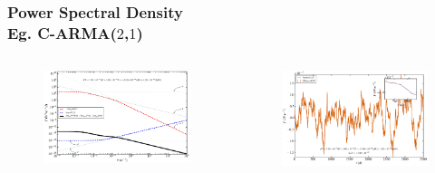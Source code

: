 \documentclass[hyperref={pdfpagelabels=false}]{beamer}
\begin{document}
\begin{frame}
\frametitle{Power Spectral Density\\Eg. C-ARMA($2$,$1$)}
  \begin{columns}
    \begin{column}{0.5\textwidth}
      \begin{figure}
        \includegraphics[scale=0.04]{images/CARMA(2,1)_PSD.jpg}
      \end{figure}
    \end{column}
    \begin{column}{0.5\textwidth}
      \begin{figure}
        \includegraphics[scale=0.04]{images/CARMA(2,1)_LC.jpg}
      \end{figure}
    \end{column}
  \end{columns}
\end{frame}
\end{document}
